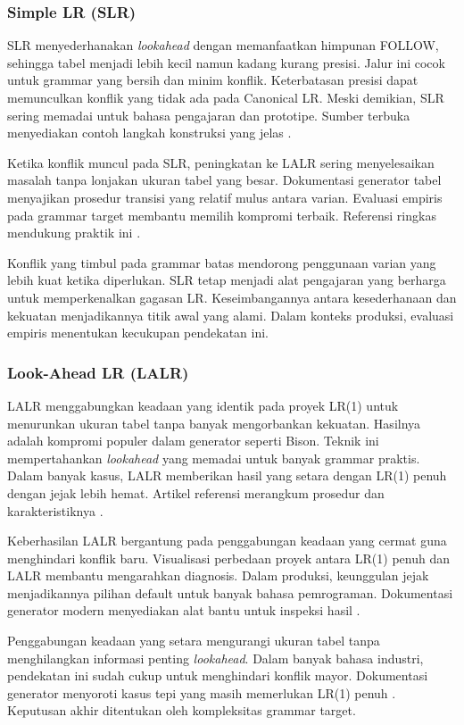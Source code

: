\documentclass[../main.tex]{subfiles}
\begin{document}
\subsubsection{Simple LR (SLR)}
SLR menyederhanakan \emph{lookahead} dengan memanfaatkan himpunan FOLLOW, sehingga tabel menjadi lebih kecil namun kadang kurang presisi. Jalur ini cocok untuk grammar yang bersih dan minim konflik. Keterbatasan presisi dapat memunculkan konflik yang tidak ada pada Canonical LR. Meski demikian, SLR sering memadai untuk bahasa pengajaran dan prototipe. Sumber terbuka menyediakan contoh langkah konstruksi yang jelas \citep{WikiSLR}.

Ketika konflik muncul pada SLR, peningkatan ke LALR sering menyelesaikan masalah tanpa lonjakan ukuran tabel yang besar. Dokumentasi generator tabel menyajikan prosedur transisi yang relatif mulus antara varian. Evaluasi empiris pada grammar target membantu memilih kompromi terbaik. Referensi ringkas mendukung praktik ini \citep{WikiSLR}.

Konflik yang timbul pada grammar batas mendorong penggunaan varian yang lebih kuat ketika diperlukan. SLR tetap menjadi alat pengajaran yang berharga untuk memperkenalkan gagasan LR. Keseimbangannya antara kesederhanaan dan kekuatan menjadikannya titik awal yang alami. Dalam konteks produksi, evaluasi empiris menentukan kecukupan pendekatan ini.

\subsubsection{Look-Ahead LR (LALR)}
LALR menggabungkan keadaan yang identik pada proyek LR(1) untuk menurunkan ukuran tabel tanpa banyak mengorbankan kekuatan. Hasilnya adalah kompromi populer dalam generator seperti Bison. Teknik ini mempertahankan \emph{lookahead} yang memadai untuk banyak grammar praktis. Dalam banyak kasus, LALR memberikan hasil yang setara dengan LR(1) penuh dengan jejak lebih hemat. Artikel referensi merangkum prosedur dan karakteristiknya \citep{WikiLALR}.

Keberhasilan LALR bergantung pada penggabungan keadaan yang cermat guna menghindari konflik baru. Visualisasi perbedaan proyek antara LR(1) penuh dan LALR membantu mengarahkan diagnosis. Dalam produksi, keunggulan jejak menjadikannya pilihan default untuk banyak bahasa pemrograman. Dokumentasi generator modern menyediakan alat bantu untuk inspeksi hasil \citep{BisonManual}.

\IfSubfilesClassLoaded{


}{}

Penggabungan keadaan yang setara mengurangi ukuran tabel tanpa menghilangkan informasi penting \emph{lookahead}. Dalam banyak bahasa industri, pendekatan ini sudah cukup untuk menghindari konflik mayor. Dokumentasi generator menyoroti kasus tepi yang masih memerlukan LR(1) penuh \citep{WikiLALR}. Keputusan akhir ditentukan oleh kompleksitas grammar target.

\IfSubfilesClassLoaded{%


}{}
\end{document}
